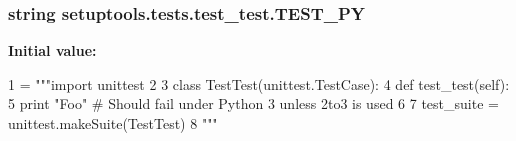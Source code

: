 \subsubsection[{T\+E\+S\+T\+\_\+\+P\+Y}]{\setlength{\rightskip}{0pt plus 5cm}string setuptools.\+tests.\+test\+\_\+test.\+T\+E\+S\+T\+\_\+\+P\+Y}\label{namespacesetuptools_1_1tests_1_1test__test_ab3539ee847634899ab0d0909bdd1eccc}
{\bfseries Initial value\+:}
\begin{DoxyCode}
1 = \textcolor{stringliteral}{"""import unittest}
2 \textcolor{stringliteral}{}
3 \textcolor{stringliteral}{class TestTest(unittest.TestCase):}
4 \textcolor{stringliteral}{    def test\_test(self):}
5 \textcolor{stringliteral}{        print "Foo" # Should fail under Python 3 unless 2to3 is used}
6 \textcolor{stringliteral}{}
7 \textcolor{stringliteral}{test\_suite = unittest.makeSuite(TestTest)}
8 \textcolor{stringliteral}{"""}
\end{DoxyCode}
